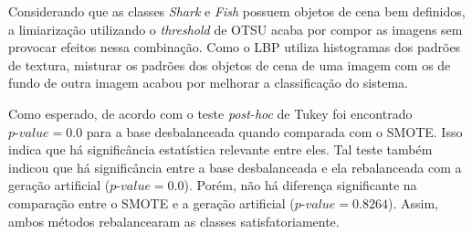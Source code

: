 
Considerando que as classes \textit{Shark} e \textit{Fish} possuem objetos de cena bem definidos, a limiarização utilizando o \textit{threshold} de OTSU acaba por compor as imagens sem provocar efeitos nessa combinação. Como o LBP utiliza histogramas dos padrões de textura, misturar os padrões dos objetos de cena de uma imagem com os de fundo de outra imagem acabou por melhorar a classificação do sistema.

Como esperado, de acordo com o teste \textit{post-hoc} de Tukey foi encontrado $\textit{p-value} = 0.0$ para a base desbalanceada quando comparada com o SMOTE. Isso indica que há significância estatística relevante entre eles. Tal teste também indicou que há significância entre a base desbalanceada e ela rebalanceada com a geração artificial ($\textit{p-value} = 0.0$). Porém, não há diferença significante na comparação entre o SMOTE e a geração artificial ($\textit{p-value} = 0.8264$). Assim, ambos métodos rebalancearam as classes satisfatoriamente.

%



